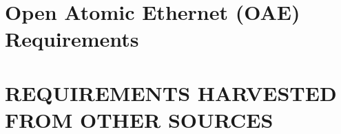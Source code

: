 \documentclass[HFT-main.tex]{subfiles}
\begin{document}
%
%
%

\section{Open Atomic Ethernet (OAE) Requirements}


%

\section{REQUIREMENTS HARVESTED FROM OTHER SOURCES}
\end{document}
